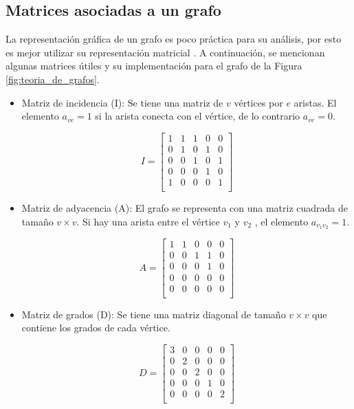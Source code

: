 \subsection{Matrices asociadas a un grafo}
La representación gráfica de un grafo es poco práctica para su análisis, por esto es mejor utilizar su representación matricial \cite{FrancoF_2016_trabajo_fin_de_grado}. A continuación, se mencionan algunas matrices útiles y su implementación para el grafo de la Figura \ref{fig:teoria_de_grafos}.


\begin{itemize}
	\item Matriz de incidencia (I): Se tiene una matriz de $v$ vértices por $e$ aristas. El elemento $a_{ve} = 1 $ si la arista conecta con el vértice, de lo contrario $a_{ve} = 0$.
	
	\[
	I = 
	\left[\begin{array}{ccccc}
		1 & 1 & 1 & 0 & 0 \\
		0 & 1 & 0 & 1 & 0 \\
		0 & 0 & 1 & 0 & 1 \\
		0 & 0 & 0 & 1 & 0 \\
		1 & 0 & 0 & 0 & 1 \\
	\end{array} \right]
	\]
	
	\item Matriz de adyacencia (A): El grafo se representa con una matriz cuadrada de tamaño $v \times v$. Si hay una arista entre el vértice $v_1$ y $v_2$ , el elemento $a_{v_1 v_2} = 1$.
	
	\[
	A = 
	\left[\begin{array}{ccccc}
		1 & 1 & 0 & 0 & 0 \\
		0 & 0 & 1 & 1 & 0 \\
		0 & 0 & 0 & 1 & 0 \\
		0 & 0 & 0 & 0 & 0 \\
		0 & 0 & 0 & 0 & 0 \\
	\end{array} \right]
	\]
	
	\item Matriz de grados (D): Se tiene una matriz diagonal de tamaño $v \times v$ que contiene los grados de cada vértice. 
	
	\[
	D = 
	\left[\begin{array}{ccccc}
		3 & 0 & 0 & 0 & 0 \\
		0 & 2 & 0 & 0 & 0 \\
		0 & 0 & 2 & 0 & 0 \\
		0 & 0 & 0 & 1 & 0 \\
		0 & 0 & 0 & 0 & 2 \\
	\end{array} \right]
	\]
	

\end{itemize}
